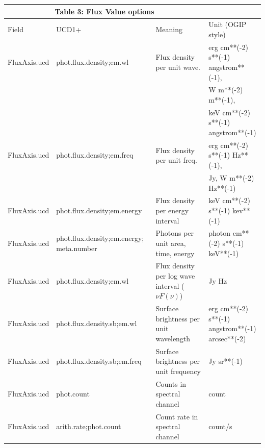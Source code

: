 \documentclass[11pt]{article}
\newcommand{\photfluxucd}{phot.flux.density}
\newcommand{\m}[1]{\mbox{#1}}
\begin{document}
\begin{flushleft}
\colorbox{iblue}{\small
\begin{minipage}[l]{7.0in}
\begin{tabular}{lp{1.5in}p{1.6in}p{2.2in}}
\multicolumn{3}{c}{Table 3: Flux Value options} \\
\hline
Field  
&UCD1+  
&Meaning  
&Unit (OGIP style)
\\
\hline
 FluxAxis.ucd &  \photfluxucd;em.wl    &  Flux density per unit wave. &  
erg cm**(-2) s**(-1) angstrom**(-1),\\
&&& W m**(-2) m**(-1),\\
&&& keV cm**(-2) s**(-1) angstrom**(-1)\\
  FluxAxis.ucd &  \photfluxucd;em.freq   &   Flux density per unit freq. &
  erg cm**(-2) s**(-1) Hz**(-1),\\
&&& Jy, W m**(-2) Hz**(-1)\\
 FluxAxis.ucd &  \photfluxucd;em.energy  &  Flux density per energy interval &
 keV cm**(-2) s**(-1) kev**(-1)\\
 FluxAxis.ucd & \photfluxucd;em.energy; meta.number &  Photons per unit area, time, energy &
photon cm**(-2) s**(-1) keV**(-1)\\
 FluxAxis.ucd &  \photfluxucd;em.wl  &  Flux density per log wave interval ($\nu F(\nu)$) &Jy Hz \\
 FluxAxis.ucd & \photfluxucd.sb;em.wl &  Surface brightness per unit wavelength &
erg cm**(-2) s**(-1) angstrom**(-1) arcsec**(-2)\\
 FluxAxis.ucd & \photfluxucd.sb;em.freq &  Surface brightness per unit frequency & 
Jy sr**(-1)\\
 FluxAxis.ucd &  phot.count  &  Counts in spectral channel &count \\
 FluxAxis.ucd &  arith.rate;phot.count  &  Count rate in spectral channel &count/s \\

\end{tabular}
\end{minipage}}
\end{flushleft}
\end{document}
